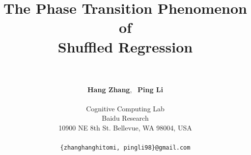 \documentclass[11pt]{article}
\begin{document}
\title{\huge \bf The Phase Transition Phenomenon of \\ Shuffled Regression\vspace{-0.05in}}

\author{\vspace{0.2in}\\\\
\textbf{Hang Zhang}, \ \textbf{Ping Li} \\\\
Cognitive Computing Lab\\
Baidu Research\\
10900 NE 8th St. Bellevue, WA 98004, USA\\\\
  \texttt{\{zhanghanghitomi,\ pingli98\}@gmail.com}
}

\date{\vspace{0.2in}}

\maketitle
\end{document}
